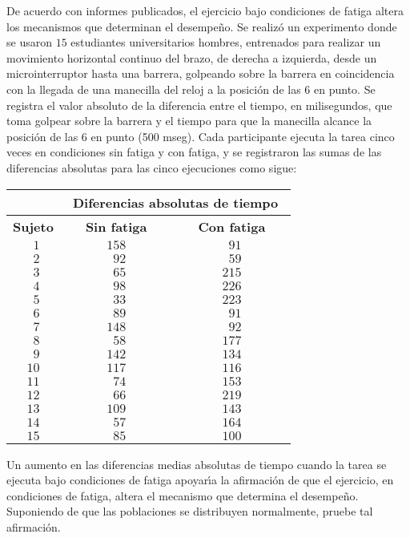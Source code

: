 \begin{enunciado}
 De acuerdo con informes publicados, el ejercicio bajo condiciones de fatiga altera los mecanismos que determinan el desempe\~no. Se realiz\'o un experimento donde se usaron $15$ estudiantes universitarios hombres, entrenados para realizar un movimiento horizontal continuo del brazo, de derecha a izquierda, desde un microinterruptor hasta una barrera, golpeando sobre la barrera en coincidencia con la llegada de una manecilla del reloj a la posici\'on de las 6 en punto. Se registra el valor absoluto de la diferencia entre el tiempo, en milisegundos, que toma golpear sobre la barrera y el tiempo para que la manecilla alcance la posici\'on de las 6 en punto (500 mseg). Cada participante ejecuta la tarea cinco veces en condiciones sin fatiga y con fatiga, y se registraron las sumas de las diferencias absolutas para las cinco ejecuciones como sigue:
 \begin{center}
  \begin{tabular}{ccc}
   & \multicolumn{2}{c}{\textbf{Diferencias absolutas de tiempo}} \\
   \hline 
   \textbf{Sujeto} & $\phantom{000}$\textbf{Sin fatiga}$\phantom{000}$ & $\phantom{000}$\textbf{Con fatiga}$\phantom{000}$ \\
   \hline 
   $\phantom{1}1$ & $158$ & $\phantom{1}91$ \\
   $\phantom{1}2$ & $\phantom{1}92$ & $\phantom{1}59$ \\
   $\phantom{1}3$ &  $\phantom{1}65$ & $215$ \\
   $\phantom{1}4$ & $\phantom{1}98$ & $226$ \\
   $\phantom{1}5$ &  $\phantom{1}33$ & $223$ \\
   $\phantom{1}6$ & $\phantom{1}89$ & $\phantom{1}91$ \\
   $\phantom{1}7$ & $148$ & $\phantom{1}92$ \\
   $\phantom{1}8$ & $\phantom{1}58$ & $177$ \\
   $\phantom{1}9$ & $142$ & $134$ \\
   $10$ & $117$ & $116$ \\
   $11$ & $\phantom{1}74$ & $153$ \\
   $12$ & $\phantom{1}66$ & $219$ \\
   $13$ & $109$ & $143$ \\
   $14$ & $\phantom{1}57$ & $164$ \\
   $15$ & $\phantom{1}85$ & $100$
  \end{tabular}
 \end{center}
 Un aumento en las diferencias medias absolutas de tiempo cuando la tarea se ejecuta bajo condiciones de fatiga apoyar\'{\i}a la afirmaci\'on de que el ejercicio, en condiciones de fatiga, altera el mecanismo que determina el desempe\~no. Suponiendo de que las poblaciones se distribuyen normalmente, pruebe tal afirmaci\'on.
\end{enunciado}

